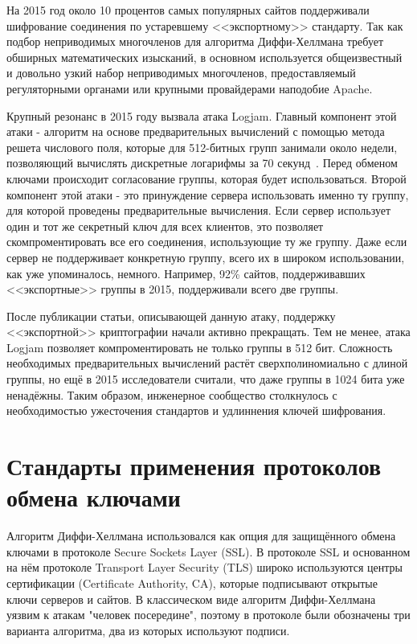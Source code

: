 \documentclass[times,specification,annotation]{itmo-student-thesis}
\begin{document}
На 2015 год около 10 процентов самых популярных сайтов поддерживали шифрование соединения по устаревшему <<экспортному>> стандарту.
Так как подбор неприводимых многочленов для алгоритма Диффи-Хеллмана требует обширных математических изысканий,
в основном используется общеизвестный и довольно узкий набор неприводимых многочленов, предоставляемый
регуляторными органами или крупными провайдерами наподобие Apache.

Крупный резонанс в 2015 году вызвала атака Logjam.
Главный компонент этой атаки - алгоритм на основе предварительных вычислений с помощью метода решета числового поля,
которые для 512-битных групп занимали около недели, позволяющий вычислять дискретные логарифмы за 70 секунд~\cite{adr15}.
Перед обменом ключами происходит согласование группы, которая будет использоваться.
Второй компонент этой атаки - это принуждение сервера использовать именно ту группу, для которой проведены предварительные вычисления.
Если сервер использует один и тот же секретный ключ для всех клиентов, это позволяет скомпроментировать все его соединения, использующие ту же группу.
Даже если сервер не поддерживает конкретную группу, всего их в широком использовании, как уже упоминалось, немного.
Например, 92\% сайтов, поддерживавших <<экспортные>> группы в 2015, поддерживали всего две группы.

После публикации статьи, описывающей данную атаку, поддержку <<экспортной>> криптографии начали активно прекращать.
Тем не менее, атака Logjam позволяет компроментировать не только группы в 512 бит.
Сложность необходимых предварительных вычислений растёт сверхполиномиально с длиной группы, но ещё в 2015 исследователи считали,
что даже группы в 1024 бита уже ненадёжны.
Таким образом, инженерное сообщество столкнулось с необходимостью ужесточения стандартов и удлиннения ключей шифрования.

\section{Стандарты применения протоколов обмена ключами}\label{sec:IETF}

Алгоритм Диффи-Хеллмана использовался как опция для защищённого обмена ключами в протоколе Secure Sockets Layer (SSL).
В протоколе SSL и основанном на нём протоколе Transport Layer Security (TLS) широко используются центры сертификации
(Certificate Authority, CA), которые подписывают открытые ключи серверов и сайтов.
В классическом виде алгоритм Диффи-Хеллмана уязвим к атакам "человек посередине", поэтому в протоколе были
обозначены три варианта алгоритма, два из которых используют подписи.
\end{document}
